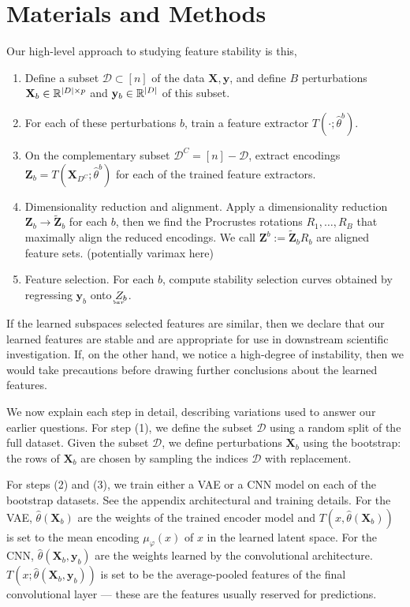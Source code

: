 
\section{Materials and Methods}

Our high-level approach to studying feature stability is this,


\begin{enumerate}
\item Define a subset $\mathcal{D}\subset \left[n\right]$ of the data $\mathbf{X}, \mathbf{y}$, and define $B$ perturbations $\mathbf{X}_{b}\in \mathbb{R}^{\left|D\right| \times p}$ and $\mathbf{y}_{b} \in \mathbb{R}^{\left|D\right|}$ of this subset.
\item For each of these perturbations $b$, train a feature extractor $T\left(\cdot; \hat{\theta}^{b}\right)$.
\item On the complementary subset $\mathcal{D}^{C} = \left[n\right] - \mathcal{D}$, extract encodings $\mathbf{Z}_{b} = T\left(\mathbf{X}_{D^{C}}; \hat{\theta}^{b}\right)$ for each of the trained feature extractors.
\item Dimensionality reduction and alignment. Apply a dimensionality reduction
  $\mathbf{Z}_{b} \to \mathbf{\tilde{Z}}_{b}$ for each $b$, then we find the
  Procrustes rotations $R_{1}, \dots, R_{B}$ that maximally align the reduced
  encodings. We call $\mathbf{Z}^{b} :=
  \mathbf{\tilde{Z}}_{b}R_{b}$ are aligned feature sets. (potentially varimax
  here)
\item Feature selection. For each $b$, compute stability selection curves
  obtained by regressing $\mathbf{y}_{b}$ onto $\underaccent{bar}{Z}_{b}$.
\end{enumerate}

If the learned subspaces selected features are similar, then we declare that our learned features are stable and are appropriate for use in downstream scientific investigation. If, on the other hand, we notice a high-degree of instability, then we would take precautions before drawing further conclusions about the learned features.

We now explain each step in detail, describing variations used to answer our earlier questions. For step (1), we define the subset $\mathcal{D}$ using a random split of the full dataset. Given the subset $\mathcal{D}$, we define perturbations $\mathbf{X}_{b}$ using the bootstrap: the rows of $\mathbf{X}_{b}$ are chosen by sampling the indices $\mathcal{D}$ with replacement.

For steps (2) and (3), we train either a VAE or a CNN model on each of the bootstrap datasets. See the appendix architectural and training details. For the VAE, $\hat{\theta}\left(\mathbf{X}_{b}\right)$ are the weights of the trained encoder model and $T\left(x, \hat{\theta}\left(\mathbf{X}_{b}\right)\right)$ is set to the mean encoding $\mu_{\varphi}\left(x\right)$ of $x$ in the learned latent space. For the CNN, $\hat{\theta}\left(\mathbf{X}_{b}, \mathbf{y}_{b}\right)$ are the weights learned by the convolutional architecture. $T\left(x; \hat{\theta}\left(\mathbf{X}_{b}, \mathbf{y}_{b}\right)\right)$ is set to be the average-pooled features of the final convolutional layer — these are the features usually reserved for predictions.

